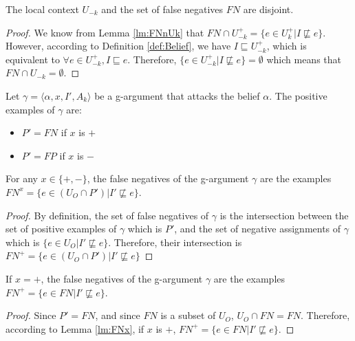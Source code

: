 \begin{lemma}\label{lm:FNdisUo}
The local context $U_{-k}$ and the set of false negatives $FN$ are disjoint.
\end{lemma}

\begin{proof}
We know from Lemma \ref{lm:FNnUk} that $FN \cap U^{+}_{-k} = \{e \in U^{+}_{k} | I \not \sqsubseteq e \}$. However, according to Definition \ref{def:Belief}, we have $I \sqsubseteq U^{+}_{-k}$, which is equivalent to $\forall e \in U^{+}_{-k}, I \sqsubseteq e$. Therefore, $\{e \in U^{+}_{-k} | I \not \sqsubseteq e \} = \emptyset$ which means that $FN \cap U_{-k} = \emptyset$.
\end{proof}

Let $\gamma = \langle \alpha, x, I', A_{k} \rangle$ be a g-argument that attacks the belief $\alpha$. The positive examples of $\gamma$ are:

\begin{itemize}
    \item $P' = FN$ if $x$ is $+$
    \item $P' = FP$ if $x$ is $-$
\end{itemize}

\begin{lemma}\label{lm:FNx}
For any $x \in \{+,-\}$, the false negatives of the g-argument $\gamma$ are the examples $FN^{x} = \{ e \in (U_{O} \cap P') | I' \not\sqsubseteq e \}$.
\end{lemma}

\begin{proof}
By definition, the set of false negatives of $\gamma$ is the intersection between the set of positive examples of $\gamma$ which is $P'$, and the set of negative assignments of $\gamma$ which is $\{ e \in U_{O} | I' \not \sqsubseteq e \}$. Therefore, their intersection is $FN^{+} = \{ e \in (U_{O} \cap P') | I' \not\sqsubseteq e \}$
\end{proof}

\begin{lemma}\label{lm:FN+1}
If $x = +$, the false negatives of the g-argument $\gamma$ are the examples $FN^{+} = \{ e \in FN | I' \not\sqsubseteq e \}$.
\end{lemma}

\begin{proof}
Since $P' = FN$, and since $FN$ is a subset of $U_{O}$, $U_{O} \cap FN = FN$. Therefore, according to Lemma \ref{lm:FNx}, if $x$ is $+$, $FN^{+} = \{ e \in FN | I' \not\sqsubseteq e \}$.
\end{proof}

